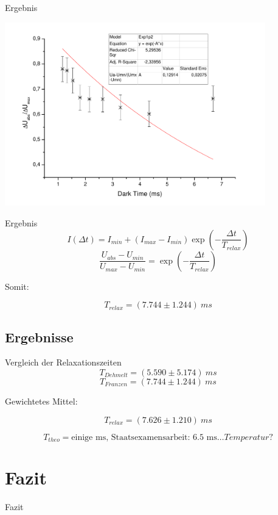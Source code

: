\documentclass{beamer}
\begin{document}
\begin{frame}{Ergebnis}
\begin{center}
\centering \includegraphics[width=0.85\textwidth]{Bilder/Franzen.pdf}
\end{center}
\end{frame}

\begin{frame}{Ergebnis}
$$I(\Delta t) = I_{min} + (I_{max}-I_{min})\exp\left(-\frac{\Delta t}{T_{relax}}\right)$$ %
$$\frac{U_{abs}-U_{min}}{U_{max}-U_{min}} = \exp\left(-\frac{\Delta t}{T_{relax}}\right)$$

Somit:

$$T_{relax} = (7.744 \pm 1.244)\ ms$$ %

\end{frame}


\subsection{Ergebnisse}
\begin{frame}{Vergleich der Relaxationszeiten}
$$T_{Dehmelt} = (5.590 \pm 5.174)\ ms$$
$$T_{Franzen} = (7.744 \pm 1.244)\ ms$$

Gewichtetes Mittel:

$$\boxed{T_{relax} = (7.626 \pm 1.210)\ ms} $$

\pause $$T_{theo} = \text{einige ms, \ \ \ Staatsexamensarbeit: 6.5 ms} \dots Temperatur?$$

\end{frame}

\section{Fazit}
\begin{frame}{Fazit}
\end{frame}
\end{document}
